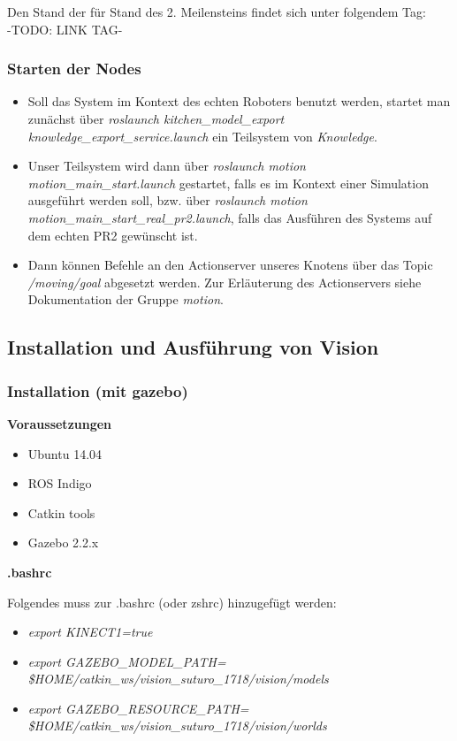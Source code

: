 \documentclass{suturo}
\begin{document}
Den Stand der für Stand  des 2. Meilensteins findet sich unter folgendem Tag: \\
-TODO: LINK TAG-

\subsubsection{Starten der Nodes}
\begin{itemize}

\item Soll das System im Kontext des echten Roboters benutzt werden, startet man zunächst über \textit{roslaunch kitchen\_model\_export knowledge\_export\_service.launch} ein Teilsystem von \textit{Knowledge}.

\item Unser Teilsystem wird dann über \textit{roslaunch motion motion\_main\_start.launch} gestartet, falls es im Kontext einer Simulation ausgeführt werden soll, bzw. über \textit{roslaunch motion motion\_main\_start\_real\_pr2.launch}, falls das Ausführen des Systems auf dem echten PR2 gewünscht ist.

\item Dann können Befehle an den Actionserver unseres Knotens über das Topic \textit{/moving/goal} abgesetzt werden. Zur Erläuterung des Actionservers siehe Dokumentation der Gruppe \textit{motion}.
\end{itemize}

\subsection{Installation und Ausführung von Vision}

\subsubsection{Installation (mit gazebo)}

\textbf{Voraussetzungen}

\begin{itemize}
\item Ubuntu 14.04
\item ROS Indigo
\item Catkin tools
\item Gazebo 2.2.x
\end{itemize}

\textbf{.bashrc}

Folgendes muss zur .bashrc (oder zshrc) hinzugefügt werden:
\begin{itemize}
\item \textit{export KINECT1=true}
\item \textit{export GAZEBO\_MODEL\_PATH= \$HOME/catkin\_ws/vision\_suturo\_1718/vision/models}
\item \textit{export GAZEBO\_RESOURCE\_PATH= \$HOME/catkin\_ws/vision\_suturo\_1718/vision/worlds}
\end{itemize}
\end{document}
